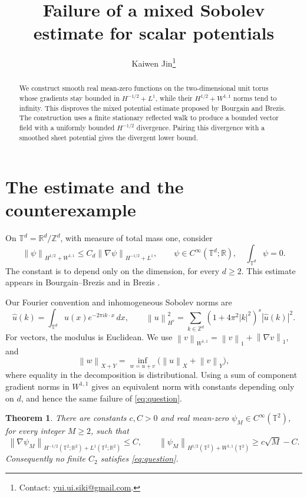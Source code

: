 \documentclass[11pt]{article}
\title{Failure of a mixed Sobolev estimate for scalar potentials}
\author{Kaiwen Jin\thanks{Contact: \href{mailto:yui.ui.siki@gmail.com}{yui.ui.siki@gmail.com}.}}
\date{}
\newtheorem{theorem}{Theorem}
\newcommand{\T}{\mathbb T}
\newcommand{\Z}{\mathbb Z}
\newcommand{\R}{\mathbb R}
\newcommand{\norm}[1]{\left\lVert#1\right\rVert}
\begin{document}
\maketitle

\begin{abstract}
We construct smooth real mean-zero functions on the two-dimensional unit
torus whose gradients stay bounded in $H^{-1/2}+L^1$, while their
$H^{1/2}+W^{1,1}$ norms tend to infinity. This disproves the mixed
potential estimate proposed by Bourgain and Brezis. The construction uses
a finite stationary reflected walk to produce a bounded vector field
with a uniformly bounded $H^{-1/2}$ divergence. Pairing this divergence
with a smoothed sheet potential gives the divergent lower bound.
\end{abstract}

\section{The estimate and the counterexample}

On $\T^d=\R^d/\Z^d$, with measure of total mass one, consider
\begin{equation}\label{eq:question}
 \norm{\psi}_{H^{1/2}+W^{1,1}}
 \leq C_d\norm{\nabla\psi}_{H^{-1/2}+L^1},
 \qquad \psi\in C^\infty(\T^d;\R),\quad \int_{\T^d}\psi=0.
\end{equation}
The constant is to depend only on the dimension, for every $d\geq2$.
This estimate appears in Bourgain--Brezis \cite[eq.~(1.16), p.~397]{BB}
and in Brezis \cite[Open Problem~7.1]{Brezis}.

Our Fourier convention and inhomogeneous Sobolev norms are
\[
 \widehat u(k)=\int_{\T^d}u(x)e^{-2\pi i k\cdot x}\,dx,
 \qquad
 \norm{u}_{H^s}^2=\sum_{k\in\Z^d}(1+4\pi^2|k|^2)^s|\widehat u(k)|^2.
\]
For vectors, the modulus is Euclidean. We use
$\norm v_{W^{1,1}}=\norm v_1+\norm{\nabla v}_1$, and
\[
 \norm w_{X+Y}=\inf_{w=u+v}
                  \bigl(\norm u_X+\norm v_Y\bigr),
\]
where equality in the decomposition is distributional. Using a sum of
component gradient norms in $W^{1,1}$ gives an equivalent norm with constants
depending only on $d$, and hence the same failure of \eqref{eq:question}.

\begin{theorem}\label{thm:main}
There are constants $c,C>0$ and real mean-zero
$\psi_M\in C^\infty(\T^2)$, for every integer $M\geq2$, such that
\begin{equation}\label{eq:main}
 \norm{\nabla\psi_M}_{H^{-1/2}(\T^2;\R^2)+L^1(\T^2;\R^2)}\leq C,
 \qquad
 \norm{\psi_M}_{H^{1/2}(\T^2)+W^{1,1}(\T^2)}\geq c\sqrt M-C.
\end{equation}
Consequently no finite $C_2$ satisfies \eqref{eq:question}.
\end{theorem}
\end{document}
